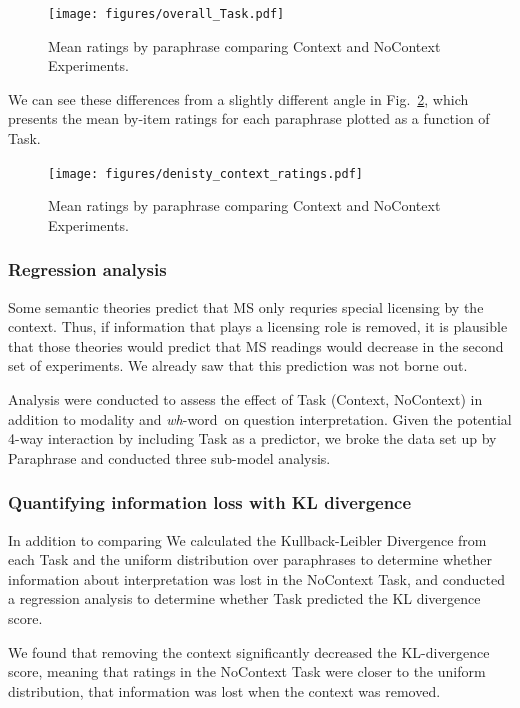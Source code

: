 \documentclass[12pt,letterpaper,table,svgnames,dvipsnames]{article}
\newcommand{\mm}[1]{\textcolor{teal}{[mm: #1]}}
\newcommand{\figref}[1]{Fig.~\ref{#1}}
\newcommand{\whw}{\emph{wh}-word~}
\begin{document}
\begin{figure}[h!]
\centering
\centering
\texttt{[image: figures/overall\_Task.pdf]}
\caption{Mean ratings by paraphrase comparing Context and NoContext Experiments.}
\label{Task_overall}
\end{figure}

We can see these differences from a slightly different angle in \figref{density_Task_overall}, which presents the mean by-item ratings for each paraphrase plotted as a function of Task. 
\begin{figure}[h!]
\centering
\centering
\texttt{[image: figures/denisty\_context\_ratings.pdf]}
\caption{Mean ratings by paraphrase comparing Context and NoContext Experiments.}
\label{density_Task_overall}
\end{figure}


\subsubsection{Regression analysis}
Some semantic theories predict that MS only requries special licensing by the context. Thus, if information that plays a licensing role is removed, it is plausible that those theories would predict that MS readings would decrease in the second set of experiments. We already saw that this prediction was not borne out. 

Analysis were conducted to assess the effect of Task (Context, NoContext) in addition to modality and \whw on question interpretation. Given the potential 4-way interaction by including Task as a predictor, we broke the data set up by Paraphrase and conducted three sub-model analysis.


\subsubsection{Quantifying information loss with KL divergence}
In addition to comparing 
We calculated the Kullback-Leibler Divergence from each Task and the uniform distribution over paraphrases to determine whether information about interpretation was lost in the NoContext Task, and conducted a regression analysis to determine whether Task predicted the KL divergence score.

We found that removing the context significantly decreased the KL-divergence score, meaning that ratings in the NoContext Task were closer to the uniform distribution, that information was lost when the context was removed.
\end{document}
